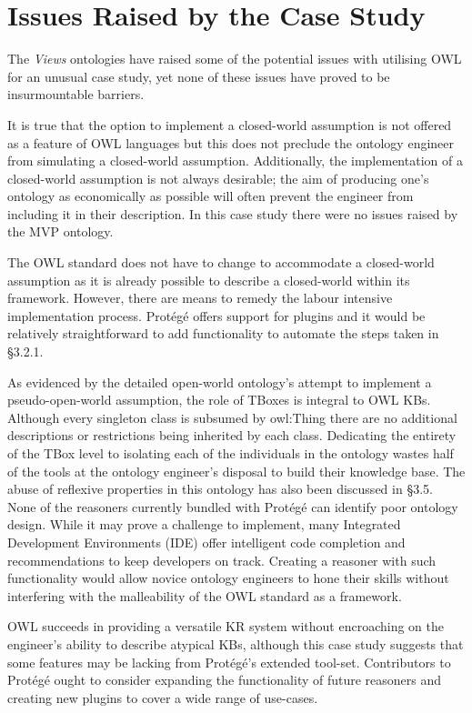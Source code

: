 \documentclass[titlepage,a4paper,12pt,oneside]{book}
\begin{document}
\section{Issues Raised by the Case Study}
The \textit{Views} ontologies have raised some of the potential issues with utilising OWL for an unusual case study, yet none of these issues have proved to be insurmountable barriers.\par
It is true that the option to implement a closed-world assumption is not offered as a feature of OWL languages but this does not preclude the ontology engineer from simulating a closed-world assumption.
Additionally, the implementation of a closed-world assumption is not always desirable; the aim of producing one's ontology as economically as possible will often prevent the engineer from including it in their description.
In this case study there were no issues raised by the MVP ontology.\par
The OWL standard does not have to change to accommodate a closed-world assumption as it is already possible to describe a closed-world within its framework.
However, there are means to remedy the labour intensive implementation process.
Protégé offers support for plugins and it would be relatively straightforward to add functionality to automate the steps taken in §3.2.1.\par
As evidenced by the detailed open-world ontology's attempt to implement a pseudo-open-world assumption, the role of TBoxes is integral to OWL KBs.
Although every singleton class is subsumed by owl:Thing there are no additional descriptions or restrictions being inherited by each class.
Dedicating the entirety of the TBox level to isolating each of the individuals in the ontology wastes half of the tools at the ontology engineer's disposal to build their knowledge base.
The abuse of reflexive properties in this ontology has also been discussed in §3.5.
None of the reasoners currently bundled with Protégé can identify poor ontology design.
While it may prove a challenge to implement, many Integrated Development Environments (IDE) offer intelligent code completion and recommendations to keep developers on track.
Creating a reasoner with such functionality would allow novice ontology engineers to hone their skills without interfering with the malleability of the OWL standard as a framework.\par
OWL succeeds in providing a versatile KR system without encroaching on the engineer's ability to describe atypical KBs, although this case study suggests that some features may be lacking from Protégé's extended tool-set.
Contributors to Protégé ought to consider expanding the functionality of future reasoners and creating new plugins to cover a wide range of use-cases.\par
\end{document}
